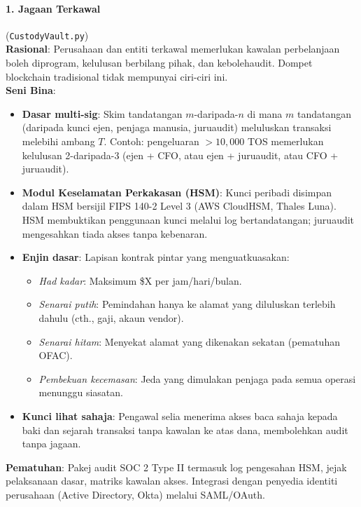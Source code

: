 \documentclass[11pt]{article}
\begin{document}
\paragraph{1. Jagaan Terkawal} (\texttt{CustodyVault.py})\\
\textbf{Rasional}: Perusahaan dan entiti terkawal memerlukan kawalan perbelanjaan boleh diprogram, kelulusan berbilang pihak, dan kebolehaudit. Dompet blockchain tradisional tidak mempunyai ciri-ciri ini.\\
\textbf{Seni Bina}:
\begin{itemize}[noitemsep]
  \item \textbf{Dasar multi-sig}: Skim tandatangan $m$-daripada-$n$ di mana $m$ tandatangan (daripada kunci ejen, penjaga manusia, juruaudit) meluluskan transaksi melebihi ambang $T$. Contoh: pengeluaran $>10,000$ TOS memerlukan kelulusan 2-daripada-3 (ejen + CFO, atau ejen + juruaudit, atau CFO + juruaudit).
  \item \textbf{Modul Keselamatan Perkakasan (HSM)}: Kunci peribadi disimpan dalam HSM bersijil FIPS 140-2 Level 3 (AWS CloudHSM, Thales Luna). HSM membuktikan penggunaan kunci melalui log bertandatangan; juruaudit mengesahkan tiada akses tanpa kebenaran.
  \item \textbf{Enjin dasar}: Lapisan kontrak pintar yang menguatkuasakan:
    \begin{itemize}[noitemsep]
      \item \emph{Had kadar}: Maksimum \$X per jam/hari/bulan.
      \item \emph{Senarai putih}: Pemindahan hanya ke alamat yang diluluskan terlebih dahulu (cth., gaji, akaun vendor).
      \item \emph{Senarai hitam}: Menyekat alamat yang dikenakan sekatan (pematuhan OFAC).
      \item \emph{Pembekuan kecemasan}: Jeda yang dimulakan penjaga pada semua operasi menunggu siasatan.
    \end{itemize}
  \item \textbf{Kunci lihat sahaja}: Pengawal selia menerima akses baca sahaja kepada baki dan sejarah transaksi tanpa kawalan ke atas dana, membolehkan audit tanpa jagaan.
\end{itemize}
\textbf{Pematuhan}: Pakej audit SOC 2 Type II termasuk log pengesahan HSM, jejak pelaksanaan dasar, matriks kawalan akses. Integrasi dengan penyedia identiti perusahaan (Active Directory, Okta) melalui SAML/OAuth.
\end{document}

